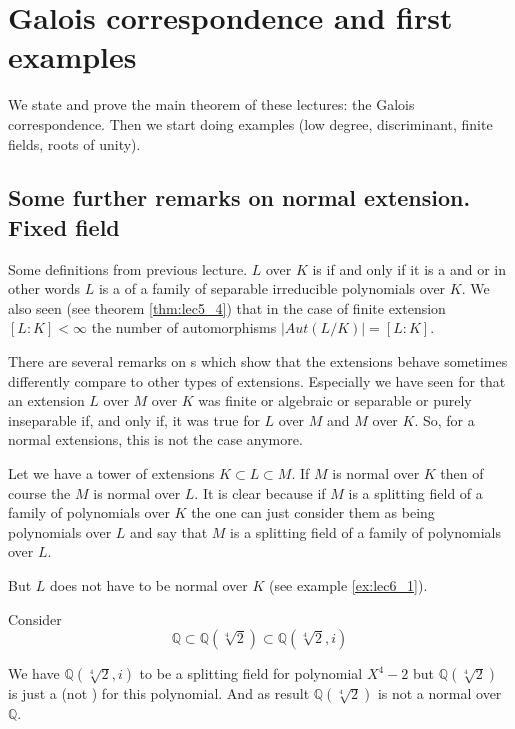 \chapter{Galois correspondence and first examples}
We state and prove the main theorem of these lectures: the Galois
correspondence. Then we start doing examples (low degree,
discriminant, finite fields, roots of unity).

\section{Some further remarks on normal extension. Fixed field}

Some definitions from previous lecture. $L$ over $K$ is
 if and only if it is a
 and  or
in other words $L$ is a  of a family of
separable irreducible polynomials over $K$. We also seen (see theorem
\ref{thm:lec5_4}) that in the case of finite extension
$\left[L:K\right] < \infty$ the number of automorphisms
$\left|Aut\left(L/K\right)\right| = \left[L:K\right]$.

There are several remarks on s which show
that the extensions behave sometimes differently compare to other
types of extensions. Especially we have seen for that an extension 
$L$ over $M$ over $K$ was finite or algebraic or separable or purely
inseparable if, and only if, it was true for $L$ over $M$ and $M$ over
$K$. So, for a normal extensions, this is not the case anymore.

\begin{remark}
  Let we have a tower of extensions $K \subset L \subset M$. If $M$ is
  normal over $K$ then of course the $M$ is normal over $L$. It is
  clear because if $M$ is a splitting field of a family of polynomials
  over $K$ the one can just consider them as being polynomials over
  $L$ and say that $M$ is a splitting field of a family of polynomials
  over $L$.

  But $L$ does not have to be normal over $K$ (see example
  \ref{ex:lec6_1}). 
\end{remark}

\begin{example}
  Consider
  \[
  \mathbb{Q} \subset
  \mathbb{Q}\left(\sqrt[4]{2}\right)
  \subset
  \mathbb{Q}\left(\sqrt[4]{2}, i\right)
  \]

  We have $\mathbb{Q}\left(\sqrt[4]{2}, i\right)$ to be a splitting
  field for polynomial $X^4 -2$ but
  $\mathbb{Q}\left(\sqrt[4]{2}\right)$ is just a
   (not ) for this
  polynomial. And as result $\mathbb{Q}\left(\sqrt[4]{2}\right)$ is
  not a normal over $\mathbb{Q}$.  
  \label{ex:lec6_1}
\end{example}

